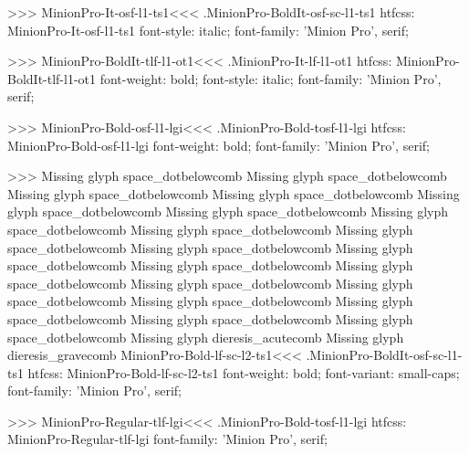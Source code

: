 {>>>
\<MinionPro-It-osf-l1-ts1\><<<
.MinionPro-BoldIt-osf-sc-l1-ts1
htfcss:  MinionPro-It-osf-l1-ts1  font-style: italic; font-family: 'Minion Pro', serif;

>>>
\<MinionPro-BoldIt-tlf-l1-ot1\><<<
.MinionPro-It-lf-l1-ot1
htfcss:  MinionPro-BoldIt-tlf-l1-ot1  font-weight: bold; font-style: italic; font-family: 'Minion Pro', serif;

>>>
\<MinionPro-Bold-osf-l1-lgi\><<<
.MinionPro-Bold-tosf-l1-lgi
htfcss:  MinionPro-Bold-osf-l1-lgi  font-weight: bold; font-family: 'Minion Pro', serif;

>>>
Missing glyph	space_dotbelowcomb
Missing glyph	space_dotbelowcomb
Missing glyph	space_dotbelowcomb
Missing glyph	space_dotbelowcomb
Missing glyph	space_dotbelowcomb
Missing glyph	space_dotbelowcomb
Missing glyph	space_dotbelowcomb
Missing glyph	space_dotbelowcomb
Missing glyph	space_dotbelowcomb
Missing glyph	space_dotbelowcomb
Missing glyph	space_dotbelowcomb
Missing glyph	space_dotbelowcomb
Missing glyph	space_dotbelowcomb
Missing glyph	space_dotbelowcomb
Missing glyph	space_dotbelowcomb
Missing glyph	space_dotbelowcomb
Missing glyph	space_dotbelowcomb
Missing glyph	space_dotbelowcomb
Missing glyph	space_dotbelowcomb
Missing glyph	dieresis_acutecomb
Missing glyph	dieresis_gravecomb
\<MinionPro-Bold-lf-sc-l2-ts1\><<<
.MinionPro-BoldIt-osf-sc-l1-ts1
htfcss:  MinionPro-Bold-lf-sc-l2-ts1  font-weight: bold; font-variant: small-caps; font-family: 'Minion Pro', serif;

>>>
\<MinionPro-Regular-tlf-lgi\><<<
.MinionPro-Bold-tosf-l1-lgi
htfcss:  MinionPro-Regular-tlf-lgi  font-family: 'Minion Pro', serif;

}
